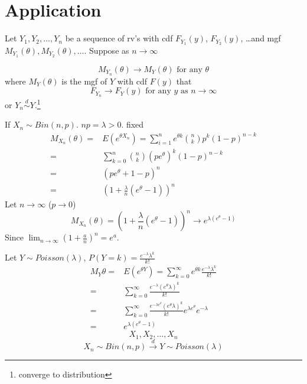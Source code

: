 \section{Application}
\begin{theo}
Let $Y_1,Y_2,\dots,Y_n$ be a sequence of rv's with cdf $F_{Y_1}(y)$, $F_{Y_2}(y)$, \dots and mgf $M_{Y_1}(\theta), M_{Y_2}(\theta),\dots $. Suppose as $n \to\infty$ 

\[M_{Y_n}(\theta) \rightarrow M_Y(\theta) \text{ for any }\theta\]
where $M_Y(\theta)$ is the mgf of $Y$ with cdf $F(y)$ that
\[F_{Y_n} \rightarrow F_Y(y) \text{ for any }y \text{ as }n \to \infty\]
or $Y_n\overset{d}{\sim} Y$.\footnote{converge to distribution}
\end{theo}

\begin{exmp}
If $X_n\sim Bin(n,p)$. $np=\lambda>0$. fixed
\begin{align*}
M_{X_n}(\theta)= & E(e^{\theta X_n}) =\sum_{i=1}^n e^{\theta k} {n \choose k} p^k (1-p)^{n-k}\\
= & \sum_{k=0}^n {n \choose k} (pe^{\theta})^k (1-p)^{n-k} \\
= & (pe^{\theta}+1-p)^n \\
= & \left(1+\frac{\lambda}{n}(e^{\theta}-1)\right)^n 
\end{align*}
Let $n \to \infty$ ($p\to 0$)
\[M_{X_n}(\theta)=  \left(1+\frac{\lambda}{n}(e^{\theta}-1)\right)^n \longrightarrow e^{\lambda(e^{\theta}-1)}\]
Since $\lim_{n\to \infty}\left(1+\frac{a}{n}\right)^n=e^a$.

Let $Y \sim Poisson(\lambda)$, $P(Y=k)=\frac{e^{-\lambda}\lambda^k}{k!}$
\begin{align*}
M_Y{\theta}= & E(e^{\theta Y}) =\sum_{k=0}^{\infty} e^{\theta k} \frac{e^{-\lambda}\lambda^k}{k!} \\
= & \sum_{k=0}^{\infty} \frac{e^{-\lambda}(e^{\theta} \lambda)^k}{k!} \\
= &  \sum_{k=0}^{\infty} \frac{e^{-\lambda e^{\theta}}(e^{\theta} \lambda)^k}{k!}  e^{\lambda e^{\theta}} e^{-\lambda} \\
= & e^{\lambda (e^{\theta}-1)} 
\end{align*}
\[X_1, X_2,\dots,X_n\]
\[X_n \sim Bin(n,p) \overset{d}{\longrightarrow} Y\sim Poisson(\lambda)\]
\end{exmp}


